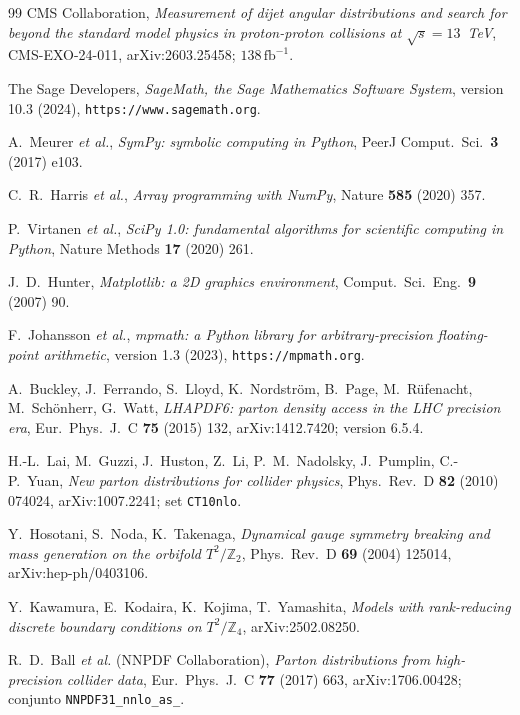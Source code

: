 \documentclass[11pt,a4paper]{article}
\newcommand{\ZZ}{\mathbb{Z}}
\begin{document}
\begin{thebibliography}{99}
 CMS Collaboration, \emph{Measurement of dijet angular distributions and search for beyond the standard model physics in proton-proton collisions at $\sqrt{s}=13$~TeV}, CMS-EXO-24-011, arXiv:2603.25458; $138\,\mathrm{fb}^{-1}$.

 The Sage Developers, \emph{SageMath, the Sage Mathematics Software System}, version 10.3 (2024), \texttt{https://www.sagemath.org}.

 A.~Meurer \emph{et al.}, \emph{SymPy: symbolic computing in Python}, PeerJ Comput.\ Sci.\ \textbf{3} (2017) e103.

 C.~R.~Harris \emph{et al.}, \emph{Array programming with NumPy}, Nature \textbf{585} (2020) 357.

 P.~Virtanen \emph{et al.}, \emph{SciPy 1.0: fundamental algorithms for scientific computing in Python}, Nature Methods \textbf{17} (2020) 261.

 J.~D.~Hunter, \emph{Matplotlib: a 2D graphics environment}, Comput.\ Sci.\ Eng.\ \textbf{9} (2007) 90.

 F.~Johansson \emph{et al.}, \emph{mpmath: a Python library for arbitrary-precision floating-point arithmetic}, version 1.3 (2023), \texttt{https://mpmath.org}.

 A.~Buckley, J.~Ferrando, S.~Lloyd, K.~Nordstr\"om, B.~Page, M.~R\"ufenacht, M.~Sch\"onherr, G.~Watt, \emph{LHAPDF6: parton density access in the LHC precision era}, Eur.\ Phys.\ J.\ C \textbf{75} (2015) 132, arXiv:1412.7420; version 6.5.4.

 H.-L.~Lai, M.~Guzzi, J.~Huston, Z.~Li, P.~M.~Nadolsky, J.~Pumplin, C.-P.~Yuan, \emph{New parton distributions for collider physics}, Phys.\ Rev.\ D \textbf{82} (2010) 074024, arXiv:1007.2241; set \texttt{CT10nlo}.

 Y.~Hosotani, S.~Noda, K.~Takenaga, \emph{Dynamical gauge symmetry breaking and mass generation on the orbifold $T^2/\ZZ_2$}, Phys.\ Rev.\ D \textbf{69} (2004) 125014, arXiv:hep-ph/0403106.

 Y.~Kawamura, E.~Kodaira, K.~Kojima, T.~Yamashita, \emph{Models with rank-reducing discrete boundary conditions on $T^2/\ZZ_4$}, arXiv:2502.08250.

 R.~D.~Ball \emph{et al.} (NNPDF Collaboration), \emph{Parton distributions from high-precision collider data}, Eur.\ Phys.\ J.\ C \textbf{77} (2017) 663, arXiv:1706.00428; conjunto \texttt{NNPDF31\_\allowbreak nnlo\_\allowbreak as\_}.


\end{thebibliography}
\end{document}
